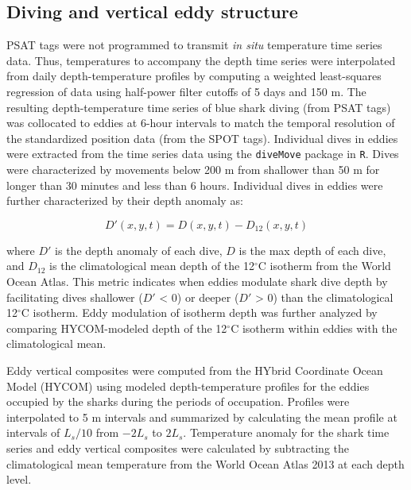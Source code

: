 \subsection{Diving and vertical eddy structure}

PSAT tags were not programmed to transmit \textit{in situ} temperature time series data. Thus, temperatures to accompany the depth time series were interpolated from daily depth-temperature profiles by computing a weighted least-squares regression of data using half-power filter cutoffs of 5 days and 150 m. The resulting depth-temperature time series of blue shark diving (from PSAT tags) was collocated to eddies at 6-hour intervals to match the temporal resolution of the standardized position data (from the SPOT tags). Individual dives in eddies were extracted from the time series data using the \texttt{diveMove} package \citep{Luque2007} in \texttt{R}. Dives were characterized by movements below 200 m from shallower than 50 m for longer than 30 minutes and less than 6 hours. Individual dives in eddies were further characterized by their depth anomaly as:

\begin{equation}
D'(x,y,t) = D(x,y,t) - D_{12}(x,y,t)
\label{eq:a5dprime}
\end{equation}

where $D'$ is the depth anomaly of each dive, $D$ is the max depth of each dive, and $D_{12}$ is the climatological mean depth of the 12$^\circ$C isotherm from the World Ocean Atlas. This metric indicates when eddies modulate shark dive depth by facilitating dives shallower ($D'$ < 0) or deeper ($D'$ > 0) than the climatological 12$^\circ$C isotherm. Eddy modulation of isotherm depth was further analyzed by comparing HYCOM-modeled \is depth of the 12$^\circ$C isotherm within eddies with the climatological mean.

Eddy vertical composites were computed from the HYbrid Coordinate Ocean Model (HYCOM)\citep{Chassignet2007} using modeled depth-temperature profiles for the eddies occupied by the sharks during the periods of occupation. Profiles were interpolated to 5 m intervals and summarized by calculating the mean profile at intervals of $L_s/10$ from $-2 L_s$ to $2 L_s$. Temperature anomaly for the shark time series and eddy vertical composites were calculated by subtracting the climatological mean temperature from the World Ocean Atlas 2013 \citep{Locarnini2013} at each depth level.


